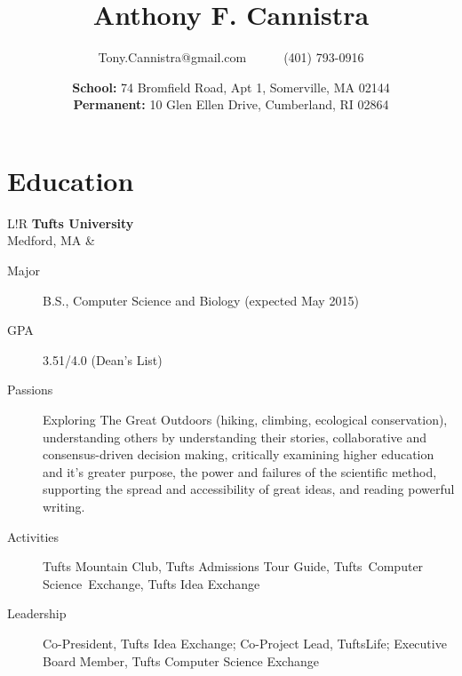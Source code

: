 \documentclass[10pt, letter]{article}
\title{\vspace{-80pt}\bfseries Anthony F. Cannistra\vspace{-10pt}}
\author{Tony.Cannistra@gmail.com~~~~~~(401) 793-0916}
\date{\vspace{-6pt}\small{
\textbf{School:} 74 Bromfield Road, Apt 1, Somerville, MA 02144\\
\textbf{Permanent:} 10 Glen Ellen Drive, Cumberland, RI 02864
\vspace{-20pt}
}
}
\newcommand\VRule{\color{lightgray}\vrule width 0.5pt}
\begin{document}
\maketitle
\thispagestyle{empty}

\section*{Education}
\begin{tabular}{L!{\VRule}R}
\textbf{Tufts University} \\ Medford, MA &
\vspace{-16.7pt}
\begin{description}
\item[Major] B.S., Computer Science and Biology (expected May 2015)
\item[GPA] 3.51/4.0 (Dean's List)
\item[Passions] Exploring The Great Outdoors (hiking, climbing, ecological conservation), understanding others by understanding their stories, collaborative and consensus-driven decision making, critically examining higher education and it's greater purpose, the power and failures of the scientific method, supporting the spread and accessibility of great ideas, and reading powerful writing.
\item[Activities] Tufts Mountain Club, Tufts Admissions Tour Guide, Tufts~Computer Science~Exchange, Tufts Idea Exchange
\item[Leadership] Co-President, Tufts Idea Exchange; Co-Project Lead, TuftsLife; Executive Board Member, Tufts Computer Science Exchange	
\end{description} \\
\end{tabular}
\end{document}
